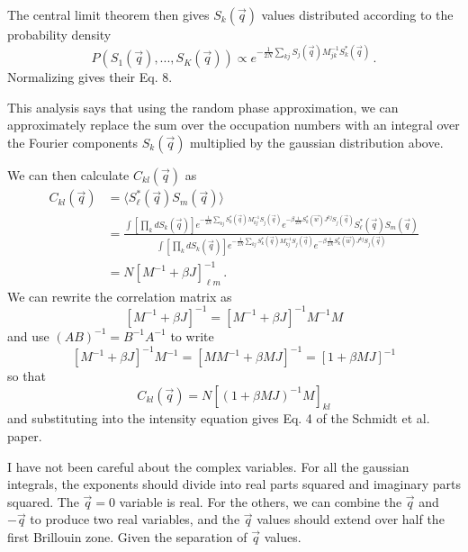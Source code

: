\documentclass[12pt]{article}
\begin{document}
The central limit theorem then gives
$S_{k}(\vec q)$ values distributed according to the probability density
\begin{equation}
P\left (S_{1}(\vec q),...,S_{K}(\vec q)\right ) \propto
e^{-\frac{1}{2N}\sum_{kj} S_j(\vec q)M_{jk}^{-1} S_k^*(\vec q)} \,.
\end{equation}
Normalizing gives their Eq. 8.

This analysis says that using the random phase approximation, we can
approximately
replace the sum over the occupation numbers with an integral over
the Fourier components $S_k(\vec q)$ multiplied by the gaussian
distribution above.

We can then calculate $C_{kl}(\vec q)$ as
\begin{equation}
\begin{split}
C_{kl}(\vec q) &=
\langle S^*_\ell(\vec q) S_m(\vec q)\rangle
\\
&=
\frac{
\int \left [\prod_k dS_k(\vec q)\right ]
e^{-\frac{1}{2N}\sum_{kj} S_k^*(\vec q)M_{kj}^{-1} S_j(\vec q)}
e^{-\beta \frac{1}{2N} S_k^*(\vec w)J^{kj}S_j(\vec q)}
S^*_\ell(\vec q) S_m(\vec q)
}
{\int \left [\prod_k dS_k(\vec q)\right ]
e^{-\frac{1}{2N}\sum_{kj} S_k^*(\vec q)M_{kj}^{-1} S_j(\vec q)}
e^{-\beta \frac{1}{2N} S_k^*(\vec w)J^{kj}S_j(\vec q)}
}
\\
&=N\left [ M^{-1}+\beta J\right ]^{-1}_{\ell m} \,.
\end{split}
\end{equation}
We can rewrite the correlation matrix as
\begin{equation}
\left [ M^{-1}+\beta J\right ]^{-1}
=  
\left [ M^{-1}+\beta J\right ]^{-1} M^{-1} M
\end{equation}
and use $(AB)^{-1} = B^{-1}A^{-1}$ to write
\begin{equation}
\left [ M^{-1}+\beta J\right ]^{-1} M^{-1}
= \left [M M^{-1}+\beta M J\right ]^{-1} = \left [1+\beta MJ\right ]^{-1}
\end{equation}
so that
\begin{equation}
C_{kl}(\vec q) = N \left [\left (1+\beta M J\right)^{-1} M \right ]_{kl}
\end{equation}
and substituting into the intensity equation gives Eq. 4 of the Schmidt et al.
paper.

I have not been careful about the complex variables. For all the gaussian
integrals, the exponents should divide into real parts squared
and imaginary parts squared. The $\vec q = 0$ variable is real. For the
others, we can combine the $\vec q$ and $-\vec q$ to produce two real
variables, and the $\vec q$ values should extend over half the first
Brillouin zone. Given the separation of $\vec q$ values.
\end{document}
